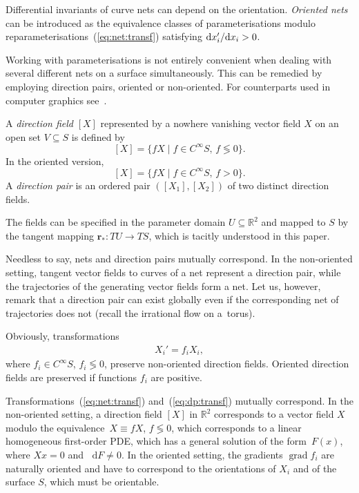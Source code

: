 \documentclass[pdftex]{sigma}
\let\ve\mathbf
\def\eqref#1{{\rm(\ref{#1})}}
\numberwithin{equation}{section}
\def\dif{\mathop{}\!\mathrm d}
\begin{document}
Differential invariants of curve nets can depend on the orientation.
{\it Oriented nets} can be introduced as the equivalence classes of
parameterisations modulo reparameterisations~\eqref{eq:net:transf} satisfying
${\rm d}x_i'/{\rm d}x_i > 0$.

Working with parameterisations is not entirely convenient when dealing with several
different nets on a surface simultaneously.
This can be remedied by employing direction pairs, oriented or non-oriented.
For counterparts used in computer graphics see~\cite[Section~2]{Vax-2016}.

\begin{Definition}%
A {\it direction field} $[X]$
represented by a nowhere vanishing vector field $X$ on an open set
$V \subseteq S$ is defined by
\[
[X]
 = \{ f X \mid f \in C^\infty S, \, f \lessgtr 0 \}.
\]
In the oriented version,
\[
[X]
 = \{ f X \mid f \in C^\infty S, \, f > 0 \}.
\]
A {\it direction pair}
is an ordered pair $([X_1], [X_2])$ of two distinct direction fields.
\end{Definition}

The fields can be specified in the parameter domain
$U \subseteq \mathbb R^2$ and mapped to $S$ by the tangent mapping
$\ve r_* \colon  TU \to TS$, which is tacitly understood in this paper.

Needless to say, nets and direction pairs mutually correspond.
In the non-oriented setting,
tangent vector fields to curves of a net represent a direction pair,
while the trajectories of the generating vector fields form a net.
Let us, however, remark that a direction pair can exist globally even if the
corresponding net of trajectories does not (recall the irrational flow on a~torus).

Obviously, transformations
\begin{gather}
\label{eq:dp:transf}
X_i' = f_i X_i,
\end{gather}
where $f_i \in C^\infty S$, $f_i \lessgtr 0$, preserve non-oriented direction fields.
Oriented direction fields are preserved if functions $f_i$ are positive.

Transformations~\eqref{eq:net:transf}  and~\eqref{eq:dp:transf} mutually correspond.
In the non-oriented setting, a direction field $[X]$ in $\mathbb R^2$
corresponds to a vector field $X$ modulo the equivalence~$X \equiv f X$,
$f \lessgtr 0$,
which corresponds to a linear homogeneous first-order PDE,
which has a general solution of the form~$F(x)$, where $X x = 0$ and
$\dif F \ne 0$.
In the oriented setting, the gradients $\operatorname{grad} f_i$ are naturally oriented and have to
correspond to the orientations of $X_i$ and of the surface $S$, which must be orientable.
\end{document}
